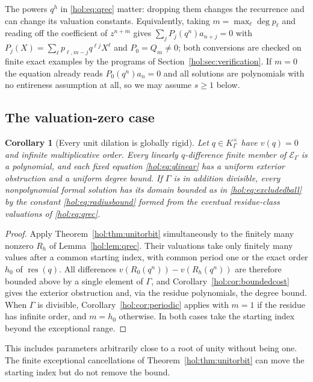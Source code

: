 \documentclass[11pt]{article}
\numberwithin{equation}{section}
\newtheorem{corollary}[theorem]{Corollary}
\theoremstyle{definition}
\theoremstyle{remark}
\newcommand{\K}{K_\Gamma}
\newcommand{\E}{\mathcal E_\Gamma}
\newcommand{\res}{\operatorname{res}}
\begin{document}
The powers $q^h$ in \eqref{hol:eq:qrec} matter: dropping them changes the
recurrence and can change its valuation constants. Equivalently, taking
$m=\max_\ell\deg p_\ell$ and reading off the coefficient of $z^{n+m}$ gives
$\sum_jP_j(q^n)a_{n+j}=0$ with
$P_j(X)=\sum_\ell p_{\ell,m-j}q^{\ell j}X^\ell$ and $P_0=Q_m\ne0$; both
conversions are checked on finite exact examples by the programs of
Section~\ref{hol:sec:verification}. If $m=0$ the equation already reads
$P_0(q^n)a_n=0$ and all solutions are polynomials with no entireness
assumption at all, so we may assume $s\ge1$ below.

\subsection{The valuation-zero case}

\begin{corollary}[Every unit dilation is globally rigid]
\label{hol:cor:unitrigid}
Let $q\in\K^\times$ have $v(q)=0$ and infinite multiplicative order. Every
linearly $q$-difference finite member of $\E$ is a polynomial, and each fixed
equation \eqref{hol:eq:qlinear} has a uniform exterior obstruction and a
uniform degree bound. If $\Gamma$ is in addition divisible, every
nonpolynomial formal solution has its domain bounded as in
\eqref{hol:eq:excludedball} by the constant \eqref{hol:eq:radiusbound} formed
from the eventual residue-class valuations of \eqref{hol:eq:qrec}.
\end{corollary}

\begin{proof}
Apply Theorem~\ref{hol:thm:unitorbit} simultaneously to the finitely many
nonzero $R_h$ of Lemma~\ref{hol:lem:qrec}. Their valuations take only finitely
many values after a common starting index, with common period one or the exact
order $h_0$ of $\res(q)$. All differences $v(R_0(q^n))-v(R_h(q^n))$ are
therefore bounded above by a single element of $\Gamma$, and
Corollary~\ref{hol:cor:boundedcost} gives the exterior obstruction and, via
the residue polynomials, the degree bound. When $\Gamma$ is divisible,
Corollary~\ref{hol:cor:periodic} applies with $m=1$ if the residue has
infinite order, and $m=h_0$ otherwise. In both cases take the starting
index beyond the exceptional range.
\end{proof}

This includes parameters arbitrarily close to a root of unity without being
one. The finite exceptional cancellations of Theorem~\ref{hol:thm:unitorbit}
can move the starting index but do not remove the bound.
\end{document}
